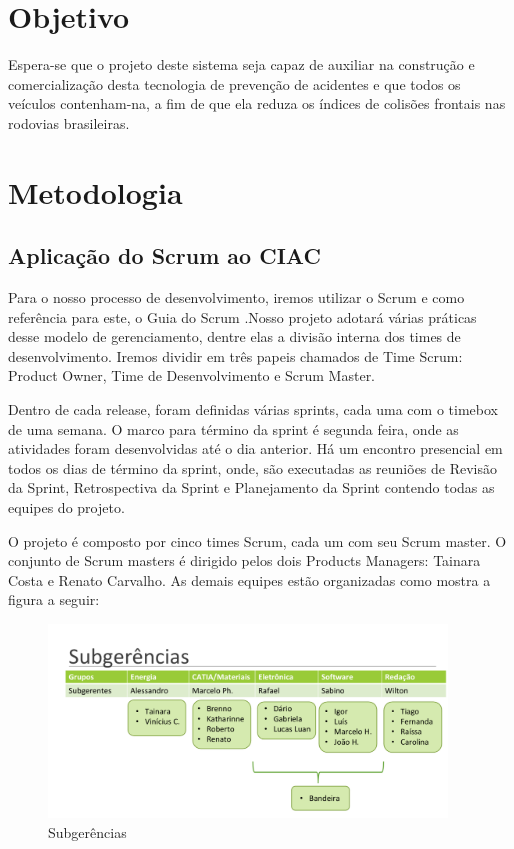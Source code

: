 \section{Objetivo}

Espera-se que o projeto deste sistema seja capaz de auxiliar na construção e comercialização desta tecnologia de prevenção de acidentes e que todos os veículos contenham-na, a fim de que ela reduza os índices de colisões frontais nas rodovias brasileiras.

\section{Metodologia}

\subsection{Aplicação do Scrum ao CIAC}

Para o nosso processo de desenvolvimento, iremos utilizar o Scrum e como referência para este, o Guia do Scrum \cite{guiaScrum}.Nosso projeto adotará várias práticas desse modelo de gerenciamento, dentre elas a divisão interna dos times de desenvolvimento. Iremos dividir em três papeis chamados de Time Scrum: Product Owner, Time de Desenvolvimento e Scrum Master. 

Dentro de cada release, foram definidas várias sprints, cada uma com o timebox de uma semana. O marco para término da sprint é segunda feira, onde as atividades foram desenvolvidas até o dia anterior. Há um encontro presencial em todos os dias de término da sprint, onde, são executadas as reuniões de Revisão da Sprint, Retrospectiva da Sprint e Planejamento da Sprint contendo todas as equipes do projeto.

O projeto é composto por cinco times Scrum, cada um com seu Scrum master. O conjunto de Scrum masters é dirigido pelos dois Products Managers: Tainara Costa e Renato Carvalho. As demais equipes estão organizadas como mostra a figura a seguir: 

\begin{figure}[h]
  \centering
  \includegraphics[width=400px, scale=1]{figuras/time}
  \caption{Subgerências}
\label{fig:time}
\end{figure}


